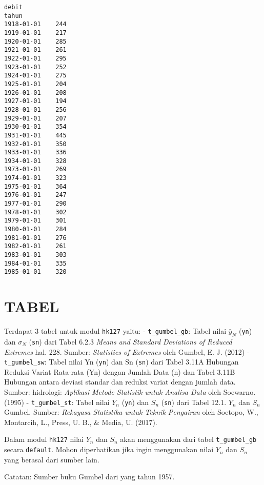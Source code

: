 \documentclass[11pt]{article}
\makeatletter
\newcommand{\boxspacing}{\kern\kvtcb@left@rule\kern\kvtcb@boxsep}
\newcommand{\prompt}[4]{
        {\ttfamily\llap{{\color{#2}[#3]:\hspace{3pt}#4}}\vspace{-\baselineskip}}
    }
\makeatother
\begin{document}
            \begin{tcolorbox}[breakable, size=fbox, boxrule=.5pt, pad at break*=1mm, opacityfill=0]
\prompt{Out}{outcolor}{ }{\boxspacing}
\begin{Verbatim}[commandchars=\\\{\}]
            debit
tahun
1918-01-01    244
1919-01-01    217
1920-01-01    285
1921-01-01    261
1922-01-01    295
1923-01-01    252
1924-01-01    275
1925-01-01    204
1926-01-01    208
1927-01-01    194
1928-01-01    256
1929-01-01    207
1930-01-01    354
1931-01-01    445
1932-01-01    350
1933-01-01    336
1934-01-01    328
1973-01-01    269
1974-01-01    323
1975-01-01    364
1976-01-01    247
1977-01-01    290
1978-01-01    302
1979-01-01    301
1980-01-01    284
1981-01-01    276
1982-01-01    261
1983-01-01    303
1984-01-01    335
1985-01-01    320
\end{Verbatim}
\end{tcolorbox}
        
    \hypertarget{tabel}{%
\section{TABEL}\label{tabel}}

Terdapat 3 tabel untuk modul \texttt{hk127} yaitu: -
\texttt{t\_gumbel\_gb}: Tabel nilai \(\bar{y}_N\) (\texttt{yn}) dan
\(\sigma_N\) (\texttt{sn}) dari Tabel 6.2.3 \emph{Means and Standard
Deviations of Reduced Extremes} hal. 228. Sumber: \emph{Statistics of
Extremes} oleh Gumbel, E. J. (2012) - \texttt{t\_gumbel\_sw}: Tabel
nilai Yn (\texttt{yn}) dan Sn (\texttt{sn}) dari Tabel 3.11A Hubungan
Reduksi Variat Rata-rata (Yn) dengan Jumlah Data (n) dan Tabel 3.11B
Hubungan antara deviasi standar dan reduksi variat dengan jumlah data.
Sumber: hidrologi: \emph{Aplikasi Metode Statistik untuk Analisa Data}
oleh Soewarno. (1995) - \texttt{t\_gumbel\_st}: Tabel nilai \(Y_n\)
(\texttt{yn}) dan \(S_n\) (\texttt{sn}) dari Tabel 12.1. \(Y_n\) dan
\(S_n\) Gumbel. Sumber: \emph{Rekayasa Statistika untuk Teknik
Pengairan} oleh Soetopo, W., Montarcih, L., Press, U. B., \& Media, U.
(2017).

Dalam modul \texttt{hk127} nilai \(Y_n\) dan \(S_n\) akan menggunakan
dari tabel \texttt{t\_gumbel\_gb} secara \texttt{default}. Mohon
diperhatikan jika ingin menggunakan nilai \(Y_n\) dan \(S_n\) yang
berasal dari sumber lain.

Catatan: Sumber buku Gumbel dari yang tahun 1957.
\end{document}
